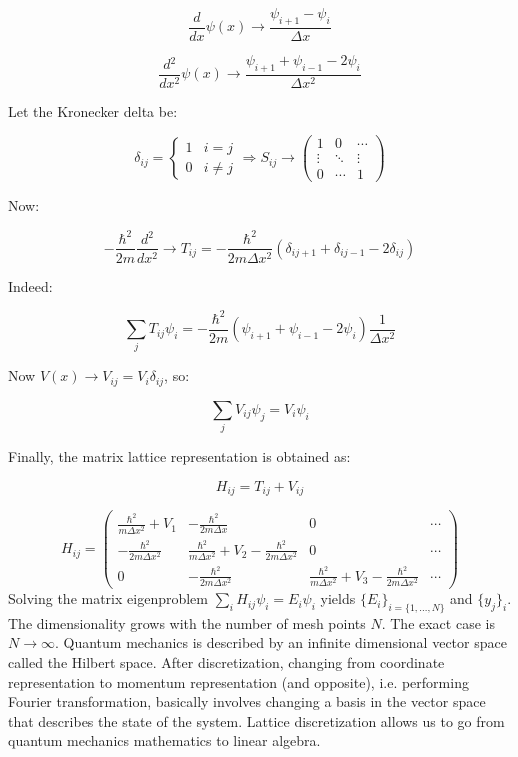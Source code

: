   $$\frac{d{}}{d{x}}\psi(x) \rightarrow \frac{\psi_{i+1}-\psi_i}{\Delta x}$$

  $$\frac{d{^2}}{d{x^2}}\psi(x) \rightarrow \frac{\psi_{i+1}+\psi_{i-1}-2\psi_i}{\Delta x^2}$$

  Let the Kronecker delta be:

      $$\delta_{ij} =\begin{cases}1 &i=j\\0 &i\neq j\end{cases}\Rightarrow S_{ij} \rightarrow\begin{pmatrix}1 & 0 & \cdots\\\vdots & \ddots &\vdots \\0&\cdots & 1 \end{pmatrix}$$

  Now:

  $$-\frac{\hbar^2}{2m}\frac{d{^2}}{d{x^2}}\rightarrow T_{ij}=-\frac{\hbar^2}{2m\Delta x^2}(\delta_{ij+1}+\delta_{ij-1}-2\delta_{ij})$$

  Indeed:

  $$\sum\limits_{j}T_{ij}\psi_i = -\frac{\hbar^2}{2m}(\psi_{i+1}+\psi_{i-1}-2\psi_i)\frac{1}{\Delta x^2}$$

  Now $V(x) \rightarrow V_{ij} = V_i\delta_{ij}$, so:

  $$\sum\limits_{j}V_{ij}\psi_j = V_i\psi_i$$

  Finally, the matrix lattice representation is obtained as:

  $$H_{ij} = T_{ij} + V_{ij}$$

  $$H_{ij} = \begin{pmatrix}\frac{\hbar^2}{m\Delta x^2} + V_1 & -\frac{\hbar^2}{2m\Delta x} & 0 & \cdots\\ -\frac{\hbar^2}{2m\Delta x^2} & \frac{\hbar^2}{m\Delta x^2}+V_2-\frac{\hbar^2}{2m \Delta x^2} & 0 & \cdots\\ 0 & -\frac{\hbar^2}{2m\Delta x^2} & \frac{\hbar^2}{m\Delta x^2}+V_3 - \frac{\hbar^2}{2m\Delta x^2} & \cdots\end{pmatrix}$$
\noindent
  Solving the matrix eigenproblem $\sum\limits_i H_{ij}\psi_i = E_i\psi_i$ yields $\{E_i\}_{i=\{1,\dots,N\}}$ and $\{y_j\}_i$. \\
  The dimensionality grows with the number of mesh points $N$.
  The exact case is $N\rightarrow\infty$.
  Quantum mechanics is described by an infinite dimensional vector space called the Hilbert space.
\noindent
  After discretization, changing from coordinate representation to momentum representation (and opposite), i.e. performing Fourier transformation, basically involves changing a basis in the vector space that describes the state of the system. Lattice discretization allows us to go from quantum mechanics mathematics to linear algebra.

